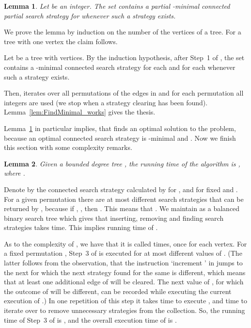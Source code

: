 \documentclass[10pt]{article}
\newenvironment{proof}[1][Proof]
{\par\noindent{\bf #1:} }{\hspace*{\fill}\nolinebreak{}\bigskip\par}
\newtheorem{lemma}{Lemma}
\begin{document}
\begin{lemma} \label{lem:finds_minimal}
Let  be an integer. The set  contains a partial -minimal connected partial search strategy for  whenever such a strategy exists.
\end{lemma}
\begin{proof}
We prove the lemma by induction on the number of the vertices of a tree. For a tree with one vertex the claim follows.

Let  be a tree with  vertices. By the induction hypothesis, after Step~1 of , the set  contains a -minimal connected search strategy for each  and for each  whenever such a strategy exists.

Then,  iterates over all permutations  of the edges in  and for each permutation all integers  are used (we stop when a strategy clearing  has been found). Lemma~\ref{lem:FindMinimal_works} gives the thesis.
\end{proof}
Lemma~\ref{lem:finds_minimal} in particular implies, that  finds an optimal solution to the  problem, because an optimal connected search strategy  is -minimal and . Now we finish this section with some complexity remarks.



\begin{lemma} \label{lem:running_time}
Given a bounded degree tree , the running time of the algorithm  is , where .
\end{lemma}
\begin{proof}
Denote by  the connected search strategy  calculated by  for , and for fixed  and . For a given permutation  there are at most  different search strategies that can be returned by , because if , , then . This means that . We maintain  as a balanced binary search tree which gives that inserting, removing and finding search strategies takes  time. This implies  running time of .

As to the complexity of , we have that it is called  times, once for each vertex. For a fixed permutation , Step~3 of  is executed for at most  different values of . (The latter follows from the observation, that the instruction `increment ' in  jumps to the next  for which the next strategy found for the same  is different, which means that at least one additional edge of  will be cleared. The next value of , for which the outcome of  will be different, can be recorded while executing the current execution of .) In one repetition of this step it takes  time to execute , and  time to iterate over  to remove unnecessary strategies from the collection. So, the running time of Step~3 of  is , and the overall execution time of  is .
\end{proof}
\end{document}
